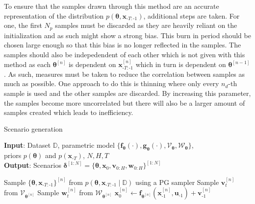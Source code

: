 To ensure that the samples drawn through this method are an accurate representation of the distribution  $p(\boldsymbol{\theta}, \boldsymbol{x}_{\text{-}T:\text{-}1})$, additional steps are taken. For one, the first $N_p$ samples must be discarded as they are heavily reliant on the initialization and as such might show a strong bias. This burn in period should be chosen large enough so that this bias is no longer reflected in the samples. The samples should also be indepedendent of each other which is not given with this method as each $\boldsymbol{\theta}^{[n]}$ is dependent on $\boldsymbol{x}_{\text{-}T:\text{-}1}^{[n]}$ which in turn is dependent on $\boldsymbol{\theta}^{[n-1]}$. As such, measures must be taken to reduce the correlation between samples as much as possible. One approach to do this is thinning where only every $n_d$-th sample is used and the other samples are discarded. By increasing this parameter, the samples become more uncorrelated but there will also be a larger amount of samples created which leads to inefficiency.

\begin{algorithm}
	\caption{Scenario generation}\label{alg:PGibbs}
	\hspace*{\algorithmicindent} \textbf{Input}: Dataset $\mathbb{D}$, parametric model $\{\boldsymbol{f}_{\boldsymbol{\theta}}(\cdot), \boldsymbol{g}_{\boldsymbol{\theta}}(\cdot), \boldsymbol{\mathcal{V}}_{\boldsymbol{\theta}}, \boldsymbol{\mathcal{W}}_{\boldsymbol{\theta}}\}$, \\
	\hspace*{\algorithmicindent} \hspace*{\algorithmicindent} priors $p(\boldsymbol{\theta})$ and $p(\boldsymbol{x}_{\text{-}T})$, $N, H, T$ \\
	\hspace*{\algorithmicindent} \textbf{Output}: Scenarios $ \boldsymbol{\delta}^{[1:N]} = \{ \boldsymbol{\theta}, \boldsymbol{x}_0, \boldsymbol{v}_{0:H}, \boldsymbol{w}_{0:H}\}^{[1:N]}$
	\begin{algorithmic}[1]
			\State Sample $\{ \boldsymbol{\theta}, \boldsymbol{x}_{\text{-}T:\text{-}1} \}^{[n]}$ from $p\left( \boldsymbol{\theta}, \boldsymbol{x}_{\text{-}T:\text{-}1} \mid \mathbb{D} \right)$ using a PG sampler
				\State Sample $\boldsymbol{v}_t^{[n]}$ from $\boldsymbol{\mathcal{V}}_{\boldsymbol{\theta}^{[n]}}$
				\State Sample $\boldsymbol{w}_t^{[n]}$ from $\boldsymbol{\mathcal{W}}_{\boldsymbol{\theta}^{[n]}}$
			\EndFor
			\State $\boldsymbol{x}_0^{[n]} \gets \boldsymbol{f}_{\boldsymbol{\theta}^{[n]}} \left( \boldsymbol{x}_{\text{-} 1}^{[n]}, \boldsymbol{u}_{\text{-} 1} \right) + \boldsymbol{v}_{\text{-} 1}^{[n]}$
		\EndFor
	\end{algorithmic}
\end{algorithm}

